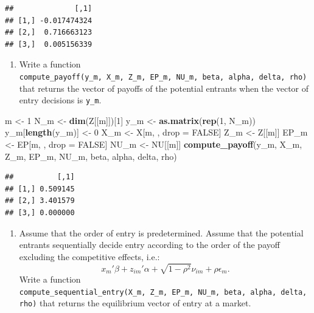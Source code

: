 \documentclass[]{book}
\newenvironment{Shaded}{\begin{snugshade}}{\end{snugshade}}
\newcommand{\KeywordTok}[1]{\textcolor[rgb]{0.13,0.29,0.53}{\textbf{#1}}}
\newcommand{\DecValTok}[1]{\textcolor[rgb]{0.00,0.00,0.81}{#1}}
\newcommand{\StringTok}[1]{\textcolor[rgb]{0.31,0.60,0.02}{#1}}
\newcommand{\OtherTok}[1]{\textcolor[rgb]{0.56,0.35,0.01}{#1}}
\newcommand{\NormalTok}[1]{#1}
\providecommand{\tightlist}{%
  \setlength{\itemsep}{0pt}\setlength{\parskip}{0pt}}
\begin{document}
\begin{verbatim}
##              [,1]
## [1,] -0.017474324
## [2,]  0.716663123
## [3,]  0.005156339
\end{verbatim}

\begin{enumerate}
\def\labelenumi{\arabic{enumi}.}
\setcounter{enumi}{3}
\tightlist
\item
  Write a function
  \texttt{compute\_payoff(y\_m,\ X\_m,\ Z\_m,\ EP\_m,\ NU\_m,\ beta,\ alpha,\ delta,\ rho)}
  that returns the vector of payoffs of the potential entrants when the
  vector of entry decisions is \texttt{y\_m}.
\end{enumerate}

\begin{Shaded}
\begin{Highlighting}[]
\NormalTok{m <-}\StringTok{ }\DecValTok{1}
\NormalTok{N_m <-}\StringTok{ }\KeywordTok{dim}\NormalTok{(Z[[m]])[}\DecValTok{1}\NormalTok{]}
\NormalTok{y_m <-}\StringTok{ }\KeywordTok{as.matrix}\NormalTok{(}\KeywordTok{rep}\NormalTok{(}\DecValTok{1}\NormalTok{, N_m))}
\NormalTok{y_m[}\KeywordTok{length}\NormalTok{(y_m)] <-}\StringTok{ }\DecValTok{0}
\NormalTok{X_m <-}\StringTok{ }\NormalTok{X[m, , drop =}\StringTok{ }\OtherTok{FALSE}\NormalTok{]}
\NormalTok{Z_m <-}\StringTok{ }\NormalTok{Z[[m]]}
\NormalTok{EP_m <-}\StringTok{ }\NormalTok{EP[m, , drop =}\StringTok{ }\OtherTok{FALSE}\NormalTok{]}
\NormalTok{NU_m <-}\StringTok{ }\NormalTok{NU[[m]]}
\KeywordTok{compute_payoff}\NormalTok{(y_m, X_m, Z_m, EP_m, NU_m, beta, alpha, delta, rho)}
\end{Highlighting}
\end{Shaded}

\begin{verbatim}
##          [,1]
## [1,] 0.509145
## [2,] 3.401579
## [3,] 0.000000
\end{verbatim}

\begin{enumerate}
\def\labelenumi{\arabic{enumi}.}
\setcounter{enumi}{4}
\tightlist
\item
  Assume that the order of entry is predetermined. Assume that the
  potential entrants sequentially decide entry according to the order of
  the payoff excluding the competitive effects, i.e.: \[
  x_m'\beta + z_{im}'\alpha + \sqrt{1 - \rho^2} \nu_{im} + \rho \epsilon_{m}.
  \] Write a function
  \texttt{compute\_sequential\_entry(X\_m,\ Z\_m,\ EP\_m,\ NU\_m,\ beta,\ alpha,\ delta,\ rho)}
  that returns the equilibrium vector of entry at a market.
\end{enumerate}
\end{document}
